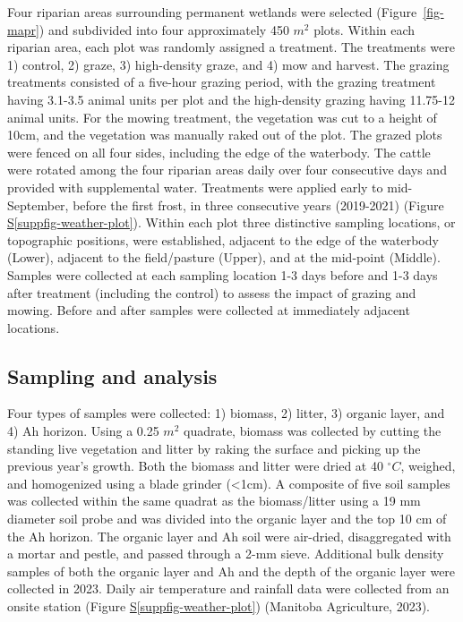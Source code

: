 \documentclass[
]{agujournal2019}
\newcommand*\quartosuppfigref[1]{Figure \hyperref[#1]{S\ref{#1}}}
\begin{document}
Four riparian areas surrounding permanent wetlands were selected
(Figure~\ref{fig-mapr}) and subdivided into four approximately 450
\(m^2\) plots. Within each riparian area, each plot was randomly
assigned a treatment. The treatments were 1) control, 2) graze, 3)
high-density graze, and 4) mow and harvest. The grazing treatments
consisted of a five-hour grazing period, with the grazing treatment
having 3.1-3.5 animal units per plot and the high-density grazing having
11.75-12 animal units. For the mowing treatment, the vegetation was cut
to a height of 10cm, and the vegetation was manually raked out of the
plot. The grazed plots were fenced on all four sides, including the edge
of the waterbody. The cattle were rotated among the four riparian areas
daily over four consecutive days and provided with supplemental water.
Treatments were applied early to mid-September, before the first frost,
in three consecutive years (2019-2021)
(\quartosuppfigref{suppfig-weather-plot}). Within each plot three
distinctive sampling locations, or topographic positions, were
established, adjacent to the edge of the waterbody (Lower), adjacent to
the field/pasture (Upper), and at the mid-point (Middle). Samples were
collected at each sampling location 1-3 days before and 1-3 days after
treatment (including the control) to assess the impact of grazing and
mowing. Before and after samples were collected at immediately adjacent
locations.

\subsection{Sampling and analysis}\label{sampling-and-analysis}

Four types of samples were collected: 1) biomass, 2) litter, 3) organic
layer, and 4) Ah horizon. Using a 0.25 \(m^2\) quadrate, biomass was
collected by cutting the standing live vegetation and litter by raking
the surface and picking up the previous year's growth. Both the biomass
and litter were dried at 40 \(^\circ C\), weighed, and homogenized using
a blade grinder (\textless1cm). A composite of five soil samples was
collected within the same quadrat as the biomass/litter using a 19 mm
diameter soil probe and was divided into the organic layer and the top
10 cm of the Ah horizon. The organic layer and Ah soil were air-dried,
disaggregated with a mortar and pestle, and passed through a 2-mm sieve.
Additional bulk density samples of both the organic layer and Ah and the
depth of the organic layer were collected in 2023. Daily air temperature
and rainfall data were collected from an onsite station
(\quartosuppfigref{suppfig-weather-plot}) (Manitoba Agriculture, 2023).
\end{document}
